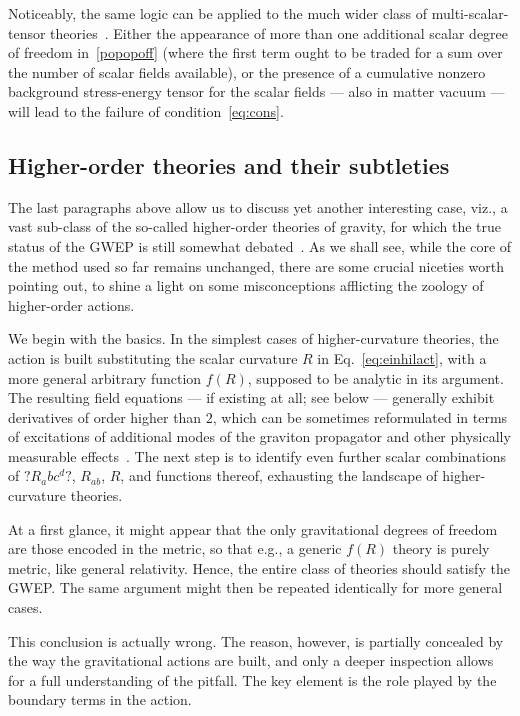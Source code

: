 \documentclass[a4paper,showkeys,aps,prd,reprint,nofootinbib,showpacs,twocolumn]{revtex4-1}
\newcommand{\ton}[1]{\left(#1\right)}
\newcommand{\eq}[1]{\( #1 \)}
\theoremstyle{plain}
\begin{document}
Noticeably, the same logic can be applied to the much wider class of multi-scalar-tensor theories~\cite{faraoni:2004cos}. Either the appearance of more than one additional scalar degree of freedom in~\eqref{popopoff} (where the first term ought to be traded for a sum over the number of scalar fields available), or the presence of a cumulative nonzero background stress-energy tensor for the scalar fields --- also in matter vacuum --- will lead to the failure of condition~\eqref{eq:cons}.


\subsection{Higher-order theories and their subtleties}
\label{ss:extended}

The last paragraphs above allow us to discuss yet another interesting case, viz., a vast sub-class of the so-called higher-order theories of gravity, for which the true status of the GWEP is still somewhat debated~\cite{will}.  As we shall see, while the core of the method used so far remains unchanged, there are some crucial niceties worth pointing out, to shine a light on some misconceptions afflicting the zoology of higher-order actions.

We begin with the basics. In the simplest cases of higher-curvature theories, the action is built substituting the scalar curvature \eq{R} in Eq.~\eqref{eq:einhilact}, with a more general arbitrary function \eq{f \! \ton{R}}, supposed to be analytic in its argument. The resulting field equations --- if existing at all; see below --- generally exhibit derivatives of order higher than \eq{2}, which can be sometimes reformulated in terms of excitations of additional modes of the graviton propagator and other physically measurable effects~\cite{Sotiriou:2008rp}. The next step is to identify even further scalar combinations of \eq{?R_abc^d?}, \eq{R_{ab}}, \eq{R}, and functions thereof, exhausting the landscape of higher-curvature theories.

At a first glance, it might appear that the only gravitational degrees of freedom are those encoded in the metric, so that e.g., a generic \eq{f \! \ton{R}} theory is purely metric, like general relativity. Hence, the entire class of theories should satisfy the GWEP.  The same argument might then be repeated identically for more general cases.

This conclusion is actually wrong.  The reason, however, is partially concealed by the way the gravitational actions are built, and only a deeper inspection allows for a full understanding of the pitfall. The key element is the role played by the boundary terms in the action.
\end{document}

